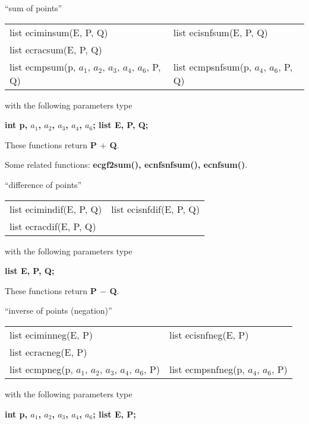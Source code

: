 \leer
\begin{center} ``sum of points'' \end{center}
\begin{center}
{\bf
\begin{tabular}{ll}
list eciminsum(E, P, Q)   & list ecisnfsum(E, P, Q)   \\
list ecracsum(E, P, Q)  &  \\
list ecmpsum(p, $a_1$, $a_2$, $a_3$, $a_4$, $a_6$, P, Q)   & list ecmpsnfsum(p, $a_4$, $a_6$, P, Q)   
\end{tabular} }
\end{center}
\parbox[t]{2.5in}{with the following parameters type}
\parbox[t]{3.0in}{
\bf int p, $a_1$, $a_2$, $a_3$, $a_4$, $a_6$;\newline
    list E, P, Q;}

These functions return {\bf P $+$ Q}.

Some related functions:\hspace*{0.7em}
{\bf ecgf2sum(), ecnfsnfsum(), ecnfsum()}.

\leer\leer
\begin{center} ``difference of points'' \end{center}
\begin{center}
{\bf
\begin{tabular}{ll}
list ecimindif(E, P, Q)   & list ecisnfdif(E, P, Q)   \\
list ecracdif(E, P, Q)  &  
\end{tabular} }
\end{center}
\parbox[t]{2.5in}{with the following parameters type}
\parbox[t]{3.0in}{
\bf list E, P, Q;}

These functions return {\bf P $-$ Q}.

\newpage

\leer\leer
\begin{center} ``inverse of points (negation)'' \end{center}
\begin{center}
{\bf
\begin{tabular}{ll}
list eciminneg(E, P)   & list ecisnfneg(E, P)   \\
list ecracneg(E, P)  &  \\
list ecmpneg(p, $a_1$, $a_2$, $a_3$, $a_4$, $a_6$, P)   & list ecmpsnfneg(p, $a_4$, $a_6$, P)   
\end{tabular} }
\end{center}
\parbox[t]{2.5in}{with the following parameters type}
\parbox[t]{3.0in}{
\bf int p, $a_1$, $a_2$, $a_3$, $a_4$, $a_6$;\newline
    list E, P;}

